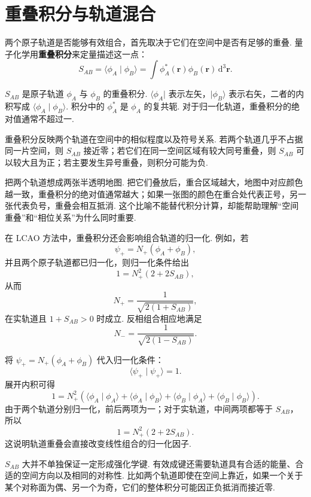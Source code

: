 \documentclass[UTF8,11pt,a4paper,openany]{ctexbook}
\newcommand{\ket}[1]{\lvert #1\rangle}\newcommand{\bra}[1]{\langle #1\rvert}
\newcommand{\braket}[2]{\langle #1\mid #2\rangle}\newcommand{\ii}{\mathrm i}
\newcommand{\dd}{\,\mathrm d}\newcommand{\Ham}{\hat H}\newcommand{\tr}{\operatorname{Tr}}
\newcommand{\term}[1]{\textbf{#1}}
\begin{document}
\section{重叠积分与轨道混合}

两个原子轨道是否能够有效组合，首先取决于它们在空间中是否有足够的重叠. 量子化学用\term{重叠积分}来定量描述这一点：
\[
S_{AB}=\braket{\phi_A}{\phi_B}
=\int \phi_A^*(\mathbf r)\phi_B(\mathbf r)\dd^3\mathbf r.
\]

\begin{notationbox}
$S_{AB}$ 是原子轨道 $\phi_A$ 与 $\phi_B$ 的重叠积分. $\bra{\phi_A}$ 表示左矢，$\ket{\phi_B}$ 表示右矢，二者的内积写成 $\braket{\phi_A}{\phi_B}$. 积分中的 $\phi_A^*$ 是 $\phi_A$ 的复共轭. 对于归一化轨道，重叠积分的绝对值通常不超过一. 
\end{notationbox}

重叠积分反映两个轨道在空间中的相似程度以及符号关系. 若两个轨道几乎不占据同一片空间，则 $S_{AB}$ 接近零；若它们在同一空间区域有较大同号重叠，则 $S_{AB}$ 可以较大且为正；若主要发生异号重叠，则积分可能为负. 

\begin{analogybox}
把两个轨道想成两张半透明地图. 把它们叠放后，重合区域越大，地图中对应颜色越一致，重叠积分的绝对值通常越大；如果一张图的颜色在重合处代表正号，另一张代表负号，重叠会相互抵消. 这个比喻不能替代积分计算，却能帮助理解“空间重叠”和“相位关系”为什么同时重要. 
\end{analogybox}

在 LCAO 方法中，重叠积分还会影响组合轨道的归一化. 例如，若
\[
\psi_+=N_+(\phi_A+\phi_B),
\]
并且两个原子轨道都已归一化，则归一化条件给出
\[
1
=N_+^2\left(2+2S_{AB}\right),
\]
从而
\[
N_+=\frac{1}{\sqrt{2(1+S_{AB})}},
\]
在实轨道且 $1+S_{AB}>0$ 时成立. 反相组合相应地满足
\[
N_-=\frac{1}{\sqrt{2(1-S_{AB})}}.
\]

\begin{derivationbox}
将 $\psi_+=N_+(\phi_A+\phi_B)$ 代入归一化条件：
\[
\braket{\psi_+}{\psi_+}=1.
\]
展开内积可得
\[
1=N_+^2\left(
\braket{\phi_A}{\phi_A}
+\braket{\phi_A}{\phi_B}
+\braket{\phi_B}{\phi_A}
+\braket{\phi_B}{\phi_B}
\right).
\]
由于两个轨道分别归一化，前后两项为一；对于实轨道，中间两项都等于 $S_{AB}$，所以
\[
1=N_+^2(2+2S_{AB}).
\]
这说明轨道重叠会直接改变线性组合的归一化因子. 
\end{derivationbox}

\begin{limitbox}
$S_{AB}$ 大并不单独保证一定形成强化学键. 有效成键还需要轨道具有合适的能量、合适的空间方向以及相同的对称性. 比如两个轨道即使在空间上靠近，如果一个关于某个对称面为偶、另一个为奇，它们的整体积分可能因正负抵消而接近零. 
\end{limitbox}
\end{document}
